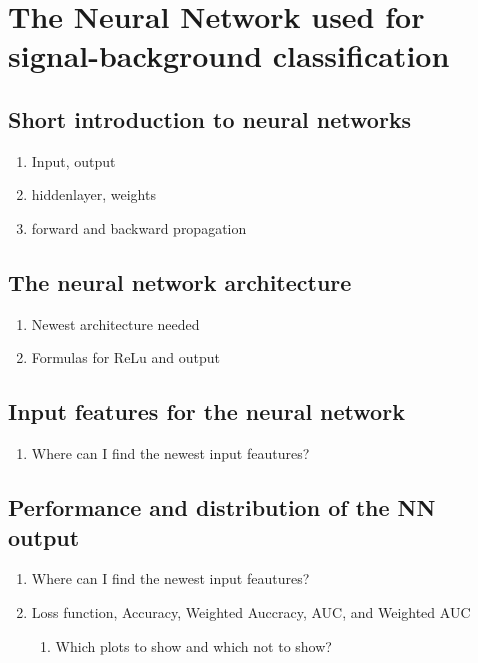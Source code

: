 \chapter{The Neural Network used for signal-background classification}
\section{Short introduction to neural networks}
\begin{enumerate}
    \item Input, output
    \item hiddenlayer, weights
    \item forward and backward propagation
\end{enumerate}
\section{The neural network architecture}
\begin{enumerate}
    \item Newest architecture needed
    \item Formulas for ReLu and output
\end{enumerate}
\section{Input features for the neural network}
\begin{enumerate}
    \item Where can I find the newest input feautures?
\end{enumerate}
\section{Performance and distribution of the NN output}
\begin{enumerate}
    \item Where can I find the newest input feautures?
    \item Loss function, Accuracy, Weighted Auccracy, AUC, and Weighted AUC 
    \begin{enumerate}
        \item Which plots to show and which not to show?
    \end{enumerate}
\end{enumerate}